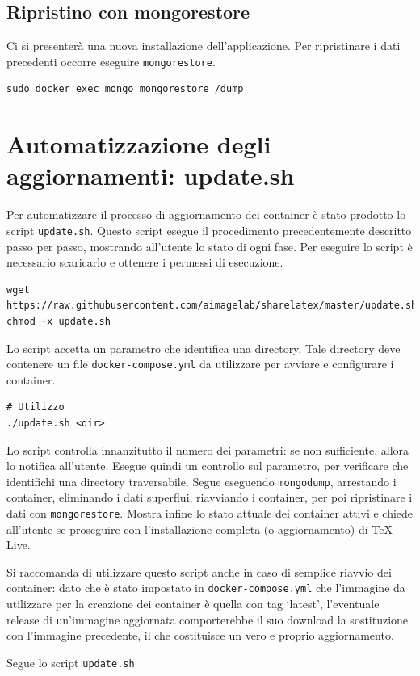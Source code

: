 \subsection{Ripristino con mongorestore}
Ci si presenterà una nuova installazione dell'applicazione. Per ripristinare i dati precedenti occorre eseguire \verb|mongorestore|.
\begin{lstlisting}
sudo docker exec mongo mongorestore /dump
\end{lstlisting}

\section{Automatizzazione degli aggiornamenti: update.sh}
Per automatizzare il processo di aggiornamento dei container è stato prodotto lo script \verb|update.sh|. Questo script esegue il procedimento precedentemente descritto passo per passo, mostrando all'utente lo stato di ogni fase. Per eseguire lo script è necessario scaricarlo e ottenere i permessi di esecuzione.
\begin{lstlisting}
wget https://raw.githubusercontent.com/aimagelab/sharelatex/master/update.sh
chmod +x update.sh
\end{lstlisting}
Lo script accetta un parametro che identifica una directory. Tale directory deve contenere un file \verb|docker-compose.yml| da utilizzare per avviare e configurare i container.
\begin{lstlisting}
# Utilizzo
./update.sh <dir>
\end{lstlisting}
Lo script controlla innanzitutto il numero dei parametri: se non sufficiente, allora lo notifica all'utente. Esegue quindi un controllo sul parametro, per verificare che identifichi una directory traversabile. Segue eseguendo \verb|mongodump|, arrestando i container, eliminando i dati superflui, riavviando i container, per poi ripristinare i dati con \verb|mongorestore|. Mostra infine lo stato attuale dei container attivi e chiede all'utente se proseguire con l'installazione completa (o aggiornamento) di TeX Live.

Si raccomanda di utilizzare questo script anche in caso di semplice riavvio dei container: dato che è stato impostato in \verb|docker-compose.yml| che l'immagine da utilizzare per la creazione dei container è quella con tag \enquote*{latest}, l'eventuale release di un'immagine aggiornata comporterebbe il suo download la sostituzione con l'immagine precedente, il che costituisce un vero e proprio aggiornamento.

Segue lo script \verb|update.sh|




